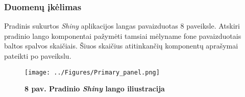 \documentclass[12pt]{article}
\begin{document}
\subsubsection*{Duomenų įkėlimas}
Pradinis sukurtos \emph{Shiny} aplikacijos langas pavaizduotas 8 paveiksle.
Atskiri pradinio lango komponentai pažymėti tamsiai mėlyname fone pavaizduotais
baltos spalvos skaičiais. Šiuos skaičius atitinkančių komponentų aprašymai
pateikti po paveikslu.

\begin{figure}[ht]
    \begin{center}
        \captionsetup{justification=centering}
        \texttt{[image: ../Figures/Primary\_panel.png]}
        \vspace{-1.5\baselineskip}
        \caption*{\small\textbf{8 pav. Pradinio \emph{Shiny} lango iliustracija}}
    \end{center}
\end{figure}

\newpage
\end{document}
